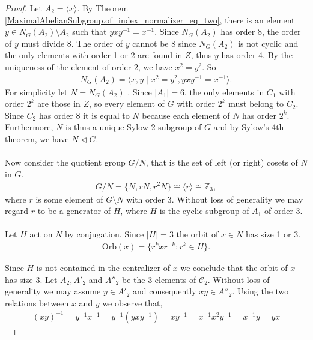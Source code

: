 \begin{proof}
Let $A_2 = \langle x \rangle$. By Theorem \ref{MaximalAbelianSubgroup.of_index_normalizer_eq_two}, there is an element $y \in N_G(A_2) \! \setminus \! A_2$ such that $y x y^{-1} = x^{-1}$. Since $N_G(A_2)$ has order 8, the order of $y$ must divide 8. The order of $y$ cannot be 8 since $N_G(A_2)$ is not cyclic and the only elements with order 1 or 2  are found in $Z$, thus $y$ has order 4. By the uniqueness of the element of order 2, we have $x^2 = y^2$. So
\begin{align*} N_G(A_2) = \langle x, y \; | \; x^2 = y^2, y x y^{-1} = x^{-1} \rangle.
\end{align*}
For simplicity let $N = N_G(A_2)$ . Since $|A_1| = 6$, the only elements in $C_1$ with order $2^k$ are those in $Z$, so every element of $G$ with order $2^k$ must belong to $C_2$. Since $C_2$ has order 8 it is equal to $N$ because each element of $N$ has order $2^k$. Furthermore, $N$ is thus a unique Sylow $2$-subgroup of $G$ and by Sylow's 4th theorem, we have $N \vartriangleleft G$. \\
\\
Now consider the quotient group $G / N$, that is the set of left (or right) cosets of $N$ in $G$.
\begin {align*} G / N = \{ N, rN, r^2N \} \cong \langle r \rangle \cong \mathbb{Z}_3,
\end{align*}
where $r$ is some element of $G\! \setminus \! N$ with order 3. Without loss of generality we may regard $r$ to be a generator of $H$, where $H$ is the cyclic subgroup of $A_1$ of order 3. \\
\\
Let $H$ act on $N$ by conjugation. Since $|H| = 3$ the orbit of $x \in N$ has size 1 or 3.
\begin{align*} \text{Orb}(x) =  \{ r^k x r^{-k} : r^k \in H \}.
\end{align*}

Since $H$ is not contained in the centralizer of $x$ we conclude that the orbit of $x$ has size 3. Let $A_2, A'_2$ and $A''_2$ be the 3 elements of $\mathcal{C}_2$. Without loss of generality we may assume $y \in A'_2$ and consequently $xy \in A''_2$. Using the two relations between $x$ and $y$ we observe that,
\begin{align*} (xy)^{-1} = y^{-1} x^{-1} = y^{-1} (y x y^{-1}) = x y^{-1} = x^{-1} x^2 y^{-1} = x^{-1} y = yx
\end{align*}



\end{proof}
